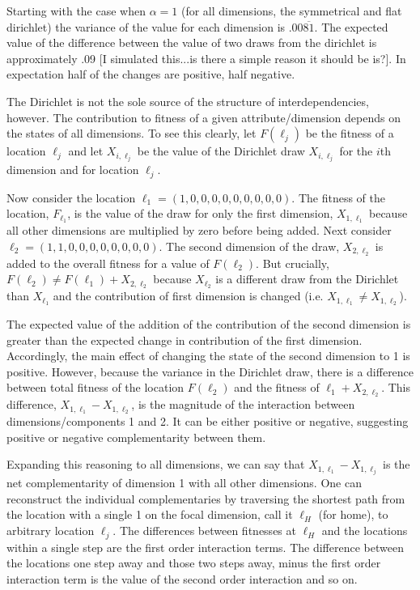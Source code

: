 \documentclass[12pt]{article}
\begin{document}
 Starting with the case when $\alpha=1$ (for all dimensions, the symmetrical and flat dirichlet) the variance of the value for each dimension is $.00\overline{81}$. The expected value of the difference between the value of two draws from the dirichlet is approximately .09 [I simulated this...is there a simple reason it should be is?]. In expectation half of the changes are positive, half negative.

The Dirichlet is not the sole source of the structure of interdependencies, however. The contribution to fitness of a given attribute/dimension depends on the states of all dimensions. To see this clearly, let $F(\ell_j)$ be the fitness of a location $\ell_j$ and let $X_{i,\ell_j}$ be the value of the Dirichlet draw $X_{i,\ell_j}$ for the $i$th dimension and for location $\ell_j$.

Now consider the location $\ell_1 = (1,0,0,0,0,0,0,0,0,0)$. The fitness of the location, $F_{\ell_1}$, is the value of the draw for only the first dimension, $X_{1,\ell_1}$ because all other dimensions are multiplied by zero before being added. Next consider $\ell_2 = (1,1,0,0,0,0,0,0,0,0)$.  The second dimension of the draw, $X_{2,\ell_2}$ is added to the overall fitness for a value of $F(\ell_2)$. But crucially, $F(\ell_2) \neq F(\ell_1) + X_{2,\ell_2}$
because $X_{\ell_2}$ is a different draw from the Dirichlet than $X_{\ell_1}$ and the contribution of first dimension is changed (i.e. $X_{1,\ell_1} \neq X_{1,\ell_2}$).

The expected value of the addition of the contribution of the second dimension is greater than the expected change in contribution of the first dimension. Accordingly, the main effect of changing the state of the second dimension to 1 is positive. However, because the variance in the Dirichlet draw, there is a difference between total fitness of the location $F(\ell_2)$ and the fitness of $\ell_1 + X_{2,\ell_2}$. This difference, $X_{1,\ell_1} - X_{1,\ell_2}$, is the magnitude of the interaction between dimensions/components 1 and 2. It can be either positive or negative, suggesting positive or negative complementarity between them.

Expanding this reasoning to all dimensions, we can say that $X_{1,\ell_1} - X_{1,\ell_j}$ is the net complementarity of dimension 1 with all other dimensions. One can reconstruct the individual complementaries by traversing the shortest path from the location with a single 1 on the focal dimension, call it $\ell_H$ (for home), to arbitrary location $\ell_j$. The differences between fitnesses at $\ell_H$ and the locations within a single step are the first order interaction terms. The difference between the locations one step away and those two steps away, minus the first order interaction term is the value of the second order interaction and so on.
\end{document}
